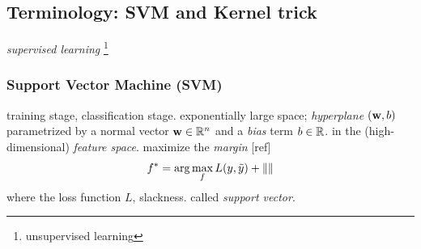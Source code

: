 \subsection{Terminology: SVM and Kernel trick}\label{sec:svm}
\emph{supervised learning} 
\footnote{unsupervised learning}
\subsubsection*{Support Vector Machine (SVM)}
training stage, classification stage.
exponentially large space;
\emph{hyperplane} $(\vb{w},b)$ parametrized by a normal vector $\vb{w}\in\mathbb{R}^n$ and a \emph{bias} term $b\in\mathbb{R}$. in the (high-dimensional) \emph{feature space}.
maximize the \emph{margin} [ref]
\begin{equation}
	f^* = \arg \max_f  L(y,\tilde{y}) + \norm{}
\end{equation}
where the loss function $L$, slackness. called \emph{support vector}.

